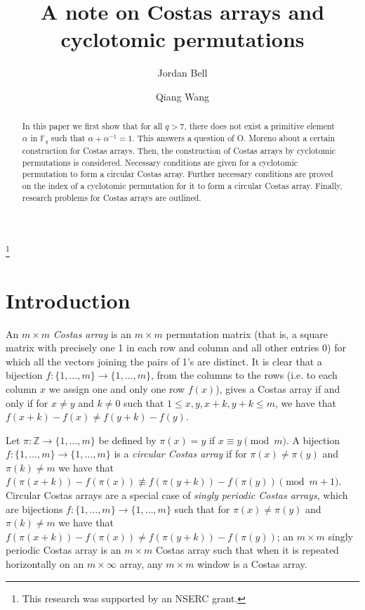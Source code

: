 \documentclass[10pt]{amsart}
\begin{document}
\title{A note on  Costas arrays and cyclotomic permutations}
\author{Jordan Bell}
\author{Qiang Wang}
\address{School of Mathematics and Statistics, Carleton
University, Ottawa, Ontario, Canada}
\thanks{This research was supported by an NSERC grant.}
 


\begin{abstract}
In this paper we first  show that for all $q>7$, there does not
exist a primitive element $\alpha$ in $\mathbb{F}_q$ such that
$\alpha+\alpha^{-1}=1$. This answers a question of O. Moreno about a
certain construction for Costas arrays.  Then, the construction of
Costas arrays by cyclotomic permutations is considered. Necessary
conditions are given for a cyclotomic permutation to form a circular Costas
array. Further necessary conditions are proved on the index of a
cyclotomic permutation for it to form a circular Costas array. Finally,
research problems for Costas arrays are outlined.
\end{abstract}

\maketitle

\section{Introduction}
\label{section:introduction} An $m \times m$ {\em Costas array} is
an $m \times m$ permutation matrix (that is, a square matrix with
precisely one 1 in each row and column and all other entries 0)
for which all the vectors joining the pairs of 1's are distinct.
It is clear that a bijection $f:\{1,\ldots,m\} \to \{1,\ldots,m\}$, from
the columns to the rows (i.e. to each column $x$ we assign one and
only one row $f(x)$), gives a Costas array if and only if for $x
\neq y$ and $k \neq 0$ such that $1 \leq x, y, x+k, y+k \leq m$, we have
that
$f(x+k)-f(x) \neq f(y+k)-f(y)$.

Let $\pi:\mathbb{Z} \to \{1,\ldots,m\}$ be 
defined by $\pi(x)=y$ if $x \equiv y \pmod {m}$.
A bijection $f:\{1,\ldots,m\} \to \{1,\ldots,m\}$ is a {\em circular
Costas array} if for
$\pi(x) \neq \pi(y)$ and $\pi(k) \neq m$
we have that
$f(\pi(x+k))-f(\pi(x)) \not \equiv
f(\pi(y+k))-f(\pi(y)) \pmod{m+1}$.
Circular Costas arrays are a special
case of {\em singly periodic Costas arrays}, which are
bijections $f:\{1,\ldots,m\} \to \{1,\ldots,m\}$ such that
for $\pi(x) \neq \pi(y)$ and $\pi(k) \neq m$
we have that
$f(\pi(x+k))-f(\pi(x)) \neq
f(\pi(y+k))-f(\pi(y))$; an $m \times m$ singly periodic Costas
array is an $m \times m$ Costas array such that when it is repeated
horizontally on an $m \times \infty$ array, any $m \times m$
window is a Costas array.
\end{document}
